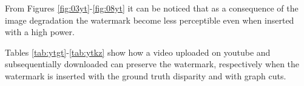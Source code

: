 From Figures \ref{fig:03yt}-\ref{fig:08yt} it can be noticed that as a consequence of the image degradation the watermark become less perceptible even when inserted with a high power. 

Tables \ref{tab:ytgt}-\ref{tab:ytkz} show how a video uploaded on youtube and subsequentially downloaded can preserve the watermark, respectively when the watermark is inserted with the ground truth disparity and with graph cuts.\newline
 
 
 \begin{table}[htbp]

  \begin{center}
  \caption{Detection statistic for a downloaded video marked with ground truth disparity\label{tab:ytgt}}
  \end{center}
  \end{table}
 
\begin{table}[htbp]
 
 \begin{center}
 \caption{Detection statistic for a downloaded video marked with graph cuts disparity\label{tab:ytkz}}
 \end{center}
 \end{table}
 
